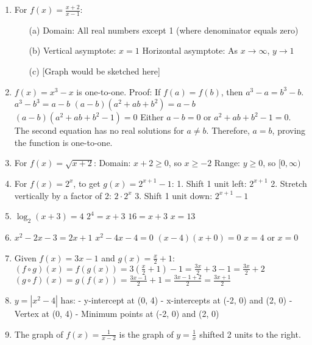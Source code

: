 \documentclass[12pt]{article}
\begin{document}
\begin{enumerate}
\item For $f(x) = \frac{x + 2}{x - 1}$:
\begin{itemize}
    \item[(a)] Domain: All real numbers except 1 (where denominator equals zero)
    \item[(b)] Vertical asymptote: $x = 1$
               Horizontal asymptote: As $x \to \infty$, $y \to 1$
    \item[(c)] [Graph would be sketched here]
\end{itemize}

\item $f(x) = x^3 - x$ is one-to-one. Proof: If $f(a) = f(b)$, then $a^3 - a = b^3 - b$.
   $a^3 - b^3 = a - b$
   $(a-b)(a^2+ab+b^2) = a - b$
   $(a-b)(a^2+ab+b^2-1) = 0$
   Either $a-b = 0$ or $a^2+ab+b^2-1 = 0$. The second equation has no real solutions for $a \neq b$.
   Therefore, $a = b$, proving the function is one-to-one.

\item For $f(x) = \sqrt{x + 2}$:
   Domain: $x + 2 \geq 0$, so $x \geq -2$
   Range: $y \geq 0$, so $[0, \infty)$

\item For $f(x) = 2^x$, to get $g(x) = 2^{x+1} - 1$:
   1. Shift 1 unit left: $2^{x+1}$
   2. Stretch vertically by a factor of 2: $2 \cdot 2^x$
   3. Shift 1 unit down: $2^{x+1} - 1$

\item $\log_2(x + 3) = 4$
   $2^4 = x + 3$
   $16 = x + 3$
   $x = 13$

\item $x^2 - 2x - 3 = 2x + 1$
   $x^2 - 4x - 4 = 0$
   $(x-4)(x+0) = 0$
   $x = 4$ or $x = 0$

\item Given $f(x) = 3x - 1$ and $g(x) = \frac{x}{2} + 1$:
   $(f \circ g)(x) = f(g(x)) = 3(\frac{x}{2} + 1) - 1 = \frac{3x}{2} + 3 - 1 = \frac{3x}{2} + 2$
   $(g \circ f)(x) = g(f(x)) = \frac{3x-1}{2} + 1 = \frac{3x-1+2}{2} = \frac{3x+1}{2}$

\item $y = |x^2 - 4|$ has:
   - y-intercept at (0, 4)
   - x-intercepts at (-2, 0) and (2, 0)
   - Vertex at (0, 4)
   - Minimum points at (-2, 0) and (2, 0)

\item The graph of $f(x) = \frac{1}{x-2}$ is the graph of $y = \frac{1}{x}$ shifted 2 units to the right.

\end{enumerate}
\end{document}
